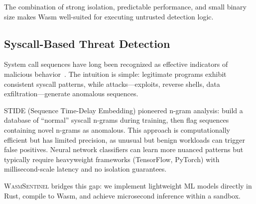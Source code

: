 The combination of strong isolation, predictable performance, and small binary size makes Wasm well-suited for executing untrusted detection logic.

\subsection{Syscall-Based Threat Detection}
\label{sec:bg-ml}

System call sequences have long been recognized as effective indicators of malicious behavior~\cite{stide}.
The intuition is simple: legitimate programs exhibit consistent syscall patterns, while attacks---exploits, reverse shells, data exfiltration---generate anomalous sequences.

STIDE (Sequence Time-Delay Embedding) pioneered n-gram analysis: build a database of ``normal'' syscall n-grams during training, then flag sequences containing novel n-grams as anomalous.
This approach is computationally efficient but has limited precision, as unusual but benign workloads can trigger false positives.
Neural network classifiers can learn more nuanced patterns but typically require heavyweight frameworks (TensorFlow, PyTorch) with millisecond-scale latency and no isolation guarantees.

\textsc{WasmSentinel} bridges this gap: we implement lightweight ML models directly in Rust, compile to Wasm, and achieve microsecond inference within a sandbox.
